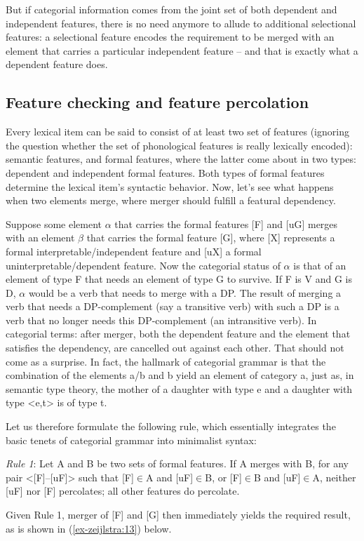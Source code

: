 \documentclass[output=paper
,modfonts
,nonflat]{langsci/langscibook}
\begin{document}
But if categorial information comes from the joint set of both dependent and independent features, there is no need anymore to allude to additional selectional features: a selectional feature encodes the requirement to be merged with an element that carries a particular independent feature – and that is exactly what a dependent feature does.

\subsection{Feature checking and feature percolation}
Every lexical item can be said to consist of at least two set of features (ignoring the question whether the set of phonological features is really lexically encoded): semantic features, and formal features, where the latter come about in two types: dependent and independent formal features. Both types of formal features determine the lexical item’s syntactic behavior. Now, let’s see what happens when two elements merge, where merger should fulfill a featural dependency.

Suppose some element $\alpha$ that carries the formal features {[}F{]} and {[}uG{]} merges with an element $\beta$ that carries the formal feature {[}G{]}, where {[}X{]} represents a formal interpretable\slash independent feature and {[}uX{]} a formal uninterpretable\slash dependent feature. Now the categorial status of $\alpha$ is that of an element of type F that needs an element of type G to survive. If F is V and G is D, $\alpha$ would be a verb that needs to merge with a DP. The result of merging a verb that needs a DP-complement (say a transitive verb) with such a DP is a verb that no longer needs this DP-complement (an intransitive verb). In categorial terms: after merger, both the dependent feature and the element that satisfies the dependency, are cancelled out against each other. That should not come as a surprise. In fact, the hallmark of categorial grammar is that the combination of the elements a/b and b yield an element of category a, just as, in semantic type theory, the mother of a daughter with type e and a daughter with type <e,t> is of type t. 

Let us therefore formulate the following rule, which essentially integrates the basic tenets of categorial grammar into minimalist syntax:

\begin{exe}
\ex \label{ex-zeijlstra:12}\textit{Rule 1}: Let A and B be two sets of formal features. If A merges with B, for any pair <{[}F{]}--{[}uF{]}> such that {[}F{]}$\in$A and {[}uF{]}$\in$B, or {[}F{]}$\in$B and {[}uF{]}$\in$A, neither {[}uF{]} nor {[}F{]} percolates; all other features do percolate.
\end{exe}
Given Rule 1, merger of {[}F{]} and {[}G{]} then immediately yields the required result, as is shown in (\ref{ex-zeijlstra:13}) below.
\end{document}
